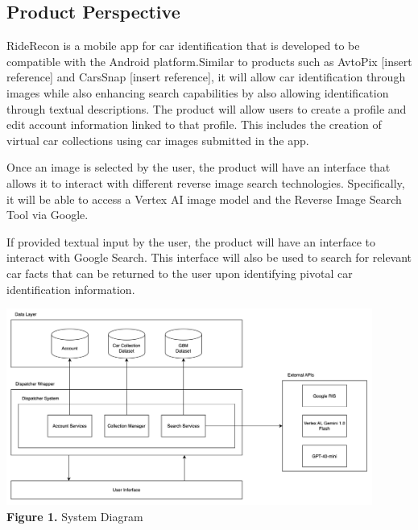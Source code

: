\documentclass[]{article}
\begin{document}
\subsection{Product Perspective}
\label{sub:product_perspective}

RideRecon is a mobile app for car identification that is developed to be compatible with the Android platform.Similar to products such as AvtoPix [insert reference] and CarsSnap [insert reference], it will allow car identification through images while also enhancing search capabilities by also allowing identification through textual descriptions. The product will allow users to create a profile and edit account information linked to that profile. This includes the creation of virtual car collections using car images submitted in the app.

Once an image is selected by the user, the product will have an interface that allows it to interact with different reverse image search technologies. Specifically, it will be able to access a Vertex AI image model and the Reverse Image Search Tool via Google.

If provided textual input by the user, the product will have an interface to interact with Google Search. This interface will also be used to search for relevant car facts that can be returned to the user upon identifying pivotal car identification information.

\begin{center}
	\includegraphics[width=0.9\textwidth]{images/system_diagram.png} \\
	\textbf{Figure 1. } System Diagram
\end{center}
\end{document}
